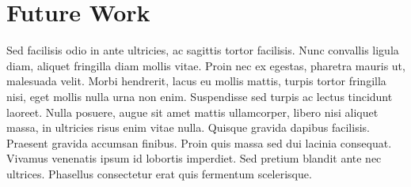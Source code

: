 \chapter{Future Work}

Sed facilisis odio in ante ultricies, ac sagittis tortor facilisis. Nunc convallis ligula diam, aliquet fringilla diam mollis vitae. Proin nec ex egestas, pharetra mauris ut, malesuada velit. Morbi hendrerit, lacus eu mollis mattis, turpis tortor fringilla nisi, eget mollis nulla urna non enim. Suspendisse sed turpis ac lectus tincidunt laoreet. Nulla posuere, augue sit amet mattis ullamcorper, libero nisi aliquet massa, in ultricies risus enim vitae nulla. Quisque gravida dapibus facilisis. Praesent gravida accumsan finibus. Proin quis massa sed dui lacinia consequat. Vivamus venenatis ipsum id lobortis imperdiet. Sed pretium blandit ante nec ultrices. Phasellus consectetur erat quis fermentum scelerisque.
